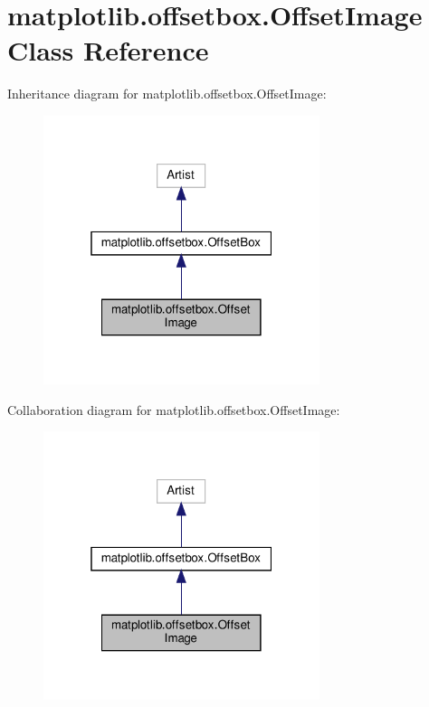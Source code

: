 \hypertarget{classmatplotlib_1_1offsetbox_1_1OffsetImage}{}\section{matplotlib.\+offsetbox.\+Offset\+Image Class Reference}
\label{classmatplotlib_1_1offsetbox_1_1OffsetImage}


Inheritance diagram for matplotlib.\+offsetbox.\+Offset\+Image\+:
\nopagebreak
\begin{figure}[H]
\begin{center}
\leavevmode
\includegraphics[width=229pt]{classmatplotlib_1_1offsetbox_1_1OffsetImage__inherit__graph}
\end{center}
\end{figure}


Collaboration diagram for matplotlib.\+offsetbox.\+Offset\+Image\+:
\nopagebreak
\begin{figure}[H]
\begin{center}
\leavevmode
\includegraphics[width=229pt]{classmatplotlib_1_1offsetbox_1_1OffsetImage__coll__graph}
\end{center}
\end{figure}
